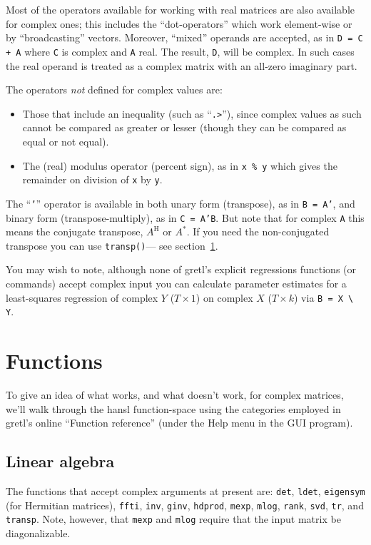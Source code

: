 \documentclass{article}
\begin{document}
Most of the operators available for working with real matrices are
also available for complex ones; this includes the ``dot-operators''
which work element-wise or by ``broadcasting'' vectors. Moreover,
``mixed'' operands are accepted, as in \texttt{D = C + A} where
\texttt{C} is complex and \texttt{A} real. The result, \texttt{D},
will be complex. In such cases the real operand is treated as a
complex matrix with an all-zero imaginary part.

The operators \textit{not} defined for complex values are:
\begin{itemize}
\item Those that include an inequality (such as ``\verb+.>+''), since
  complex values as such cannot be compared as greater or lesser
  (though they can be compared as equal or not equal).
\item The (real) modulus operator (percent sign), as in \texttt{x \%
    y} which gives the remainder on division of \texttt{x} by
  \texttt{y}.
\end{itemize}

The ``\texttt{'}'' operator is available in both unary form
(transpose), as in \texttt{B = A'}, and binary form
(transpose-multiply), as in \texttt{C = A'B}. But note that for
complex \texttt{A} this means the conjugate transpose, $A^\mathrm{H}$ or
$A^*$. If you need the non-conjugated transpose you can use
\texttt{transp()}--- see section~\ref{sec:funcs}.

You may wish to note, although none of gretl's explicit regressions
functions (or commands) accept complex input you can calculate
parameter estimates for a least-squares regression of complex $Y$
($T \times 1$) on complex $X$ ($T \times k$) via \verb|B = X \ Y|.

\section{Functions}
\label{sec:funcs}

To give an idea of what works, and what doesn't work, for complex
matrices, we'll walk through the hansl function-space using the
categories employed in gretl's online ``Function reference'' (under the
\textsf{Help} menu in the GUI program).

\subsection{Linear algebra}

The functions that accept complex arguments at present are:
\texttt{det}, \texttt{ldet}, \texttt{eigensym} (for Hermitian
matrices), \texttt{ffti}, \texttt{inv}, \texttt{ginv},
\texttt{hdprod}, \texttt{mexp}, \texttt{mlog}, \texttt{rank},
\texttt{svd}, \texttt{tr}, and \texttt{transp}. Note, however,
that \texttt{mexp} and \texttt{mlog} require that the input
matrix be diagonalizable.
\end{document}
